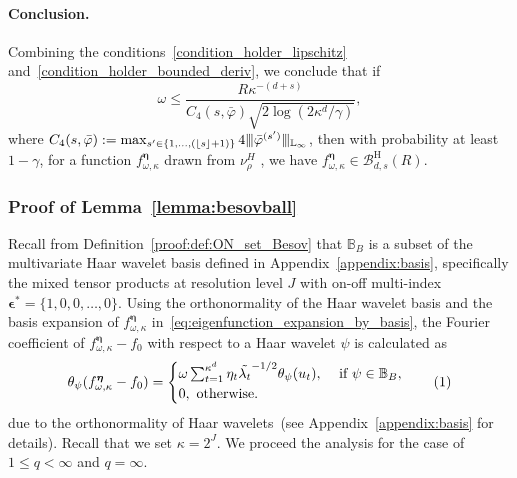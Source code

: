 \documentclass[twoside,11pt]{article}
\newcommand\numberthis{\addtocounter{equation}{1}\tag{\theequation}}
\newcommand{\floor}[1]{\lfloor #1 \rfloor} %
\newcommand{\vectorize}[1]{\mathbf{#1}}
\newcommand{\dimDensity}{d} %
\newcommand{\smoothness}{s}
\newcommand{\ballRadius}{R}
\newcommand{\ONset}{\mathbb{B}}
\newcommand{\binNum}{\kappa}           %
\newcommand{\coef}{\theta}
\newcommand{\besovParamMicroscope}{q}
\newcommand{\primResLev}{J}
\newcommand{\ballDistn}{\mathcal{B}}
\newcommand{\holderBall}{\ballDistn_{\dimDensity, \smoothness}^{\mathrm{H}}(\ballRadius)} %
\begin{document}
\begin{appendix}
	\paragraph{Conclusion.} Combining the conditions~\eqref{condition_holder_lipschitz} and~\eqref{condition_holder_bounded_deriv}, we conclude that if
	\begin{equation}
		\omega \leq \frac{R\kappa^{-(\dimDensity+s)}
		}{
			C_4(\smoothness, \bar{\varphi}) 
			\sqrt{2 \log({2\binNum^{\dimDensity}}/\gamma)}},  
	\end{equation}
	where
	$C_4(\smoothness, \bar{\varphi})  := 
	\max_{s' \in \{1, \ldots, (\floor{s}+1) \}}
	4\vert\kern-0.25ex
	\vert\kern-0.25ex
	\vert
	\bar{\varphi}^{(s')}
	\vert\kern-0.25ex
	\vert\kern-0.25ex
	\vert_{\mathbb{L}_\infty}
	$,
	then with probability at least \(1 - \gamma\),
	for a function \(f^{{\boldsymbol{\eta}}}_{\omega, \binNum}\) drawn from \(\nu_\rho^H\) , we have
	$f^{{\boldsymbol{\eta}}}_{\omega, \binNum} \in \holderBall$.
	\subsubsection{Proof of Lemma~\ref{lemma:besovball}}
	Recall from Definition~\ref{proof:def:ON_set_Besov} that \(\ONset_{B}\) is a subset of the multivariate Haar wavelet basis defined in Appendix~\ref{appendix:basis}, specifically the mixed tensor products at resolution level \(\primResLev\) with on-off multi-index \(\vectorize{\epsilon}^\ast = \{1,0,0,\ldots, 0\}\). Using the orthonormality of the Haar wavelet basis and the basis expansion of \(f^{{\boldsymbol{\eta}}}_{\omega, \binNum}\) in~\eqref{eq:eigenfunction_expansion_by_basis}, the Fourier coefficient of \(f^{{\boldsymbol{\eta}}}_{\omega, \binNum} - f_0\) with respect to a Haar wavelet \(\psi\) is calculated as
	\begin{align*}
		\coef_{\psi}
		(
		f^{{\boldsymbol{\eta}}}_{\omega, \binNum}
		-
		f_0
		)
		=
		\begin{cases}
			\omega \sum_{t=1}^{\binNum^{\dimDensity}} \eta_t \tilde{\lambda_t}^{-1/2} \coef_{\psi}(u_t),
			~
			&\text{if}~\psi \in \ONset_B,
			\\
			0,~\text{otherwise}.
		\end{cases}\numberthis \label{eq:two_sample_lower_bound_besov_coeff_calcul}
	\end{align*}
	\noindent
	due to the orthonormality of Haar wavelets~(see Appendix~\ref{appendix:basis} for details). Recall that we set $\binNum = 2^\primResLev$.
	We proceed the analysis for the case of $1 \leq \besovParamMicroscope < \infty$ and $\besovParamMicroscope = \infty$.

\end{appendix}
\end{document}
